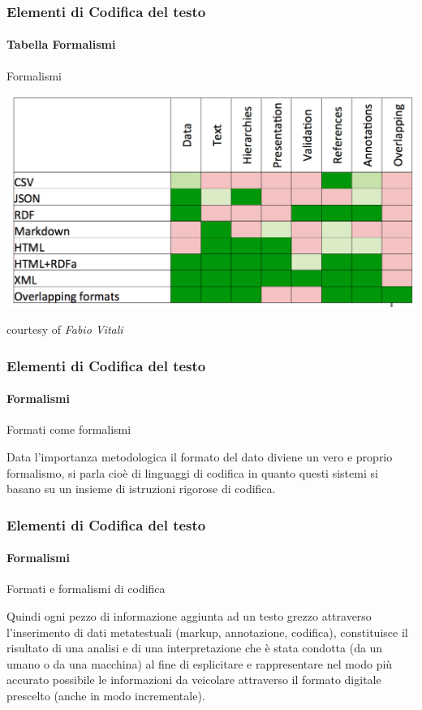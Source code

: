 \begin{frame}
	\frametitle{Elementi di Codifica del testo}
	\framesubtitle{Tabella Formalismi}
	\addtocounter{nframe}{1}

	\begin{block}{Formalismi}
		\begin{center}
			\includegraphics[width=.9\textwidth]{imgs/TabellaFormalismiCodificaTesto.png}
		\end{center}
	\end{block}
	courtesy of \textit{Fabio Vitali}

\end{frame}


\begin{frame}
	\frametitle{Elementi di Codifica del testo}
	\framesubtitle{Formalismi}
	\addtocounter{nframe}{1}

	\begin{block}{Formati come formalismi}
		\begin{center}
			Data l'importanza metodologica il formato del dato diviene un vero e proprio formalismo, si parla cioè di linguaggi di codifica in quanto questi sistemi si basano su un insieme di istruzioni rigorose di codifica.
		\end{center}

	\end{block}

\end{frame}



\begin{frame}
	\frametitle{Elementi di Codifica del testo}
	\framesubtitle{Formalismi}
	\addtocounter{nframe}{1}

	\begin{block}{Formati e formalismi di codifica}

		Quindi ogni pezzo di informazione aggiunta ad un testo grezzo attraverso l'inserimento di dati metatestuali (markup, annotazione, codifica), constituisce il risultato di una analisi e di una interpretazione che è stata condotta (da un umano o da una macchina) al fine di esplicitare e rappresentare nel modo più accurato possibile le informazioni da veicolare attraverso il formato digitale prescelto (anche in modo incrementale).


	\end{block}

\end{frame}





